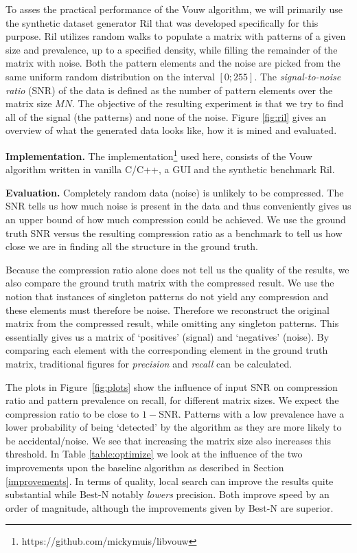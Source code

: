 \documentclass{llncs}
\begin{document}
To asses the practical performance of the Vouw algorithm, we will primarily use the synthetic dataset generator Ril that was developed specifically for this purpose. Ril utilizes random walks to populate a matrix with patterns of a given size and prevalence, up to a specified density, while filling the remainder of the matrix with noise. Both the pattern elements and the noise are picked from the same uniform random distribution on the interval $[0;255]$. The \emph{signal-to-noise ratio} (SNR) of the data is defined as the number of pattern elements over the matrix size $MN$. The objective of the resulting experiment is that we try to find all of the signal (the patterns) and none of the noise. Figure \ref{fig:ril} gives an overview of what the generated data looks like, how it is mined and evaluated.

\smallskip \noindent \textbf{Implementation.} %
The implementation\footnote{https://github.com/mickymuis/libvouw} used here, consists of the Vouw algorithm written in vanilla C/C++, a GUI and the synthetic benchmark Ril. 

\smallskip \noindent \textbf{Evaluation.} %
Completely random data (noise) is unlikely to be compressed. The SNR tells us how much noise is present in the data and thus conveniently gives us an upper bound of how much compression could be achieved. We use the ground truth SNR versus the resulting compression ratio as a benchmark to tell us how close we are in finding all the structure in the ground truth. 

Because the compression ratio alone does not tell us the quality of the results, we also compare the ground truth matrix with the compressed result. We use the notion that instances of singleton patterns do not yield any compression and these elements must therefore be noise. Therefore we reconstruct the original matrix from the compressed result, while omitting any singleton patterns. This essentially gives us a matrix of `positives' (signal) and `negatives' (noise). By comparing each element with the corresponding element in the ground truth matrix, traditional figures for \emph{precision} and \emph{recall} can be calculated.

The plots in Figure~\ref{fig:plots} show the influence of input SNR on compression ratio and pattern prevalence on recall, for different matrix sizes. We expect the compression ratio to be close to $1-\mathrm{SNR}$. Patterns with a low prevalence have a lower probability of being `detected' by the algorithm as they are more likely to be accidental/noise. We see that increasing the matrix size also increases this threshold. In Table \ref{table:optimize} we look at the influence of the two improvements upon the baseline algorithm as described in Section \ref{improvements}. In terms of quality, local search can improve the results quite substantial while Best-N notably \emph{lowers} precision. Both improve speed by an order of magnitude, although the improvements given by Best-N are superior. %
\end{document}

